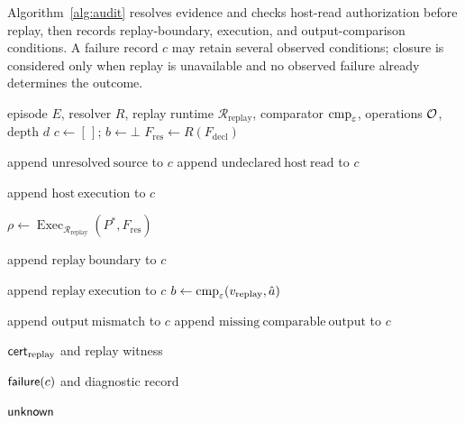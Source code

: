 Algorithm~\ref{alg:audit} resolves evidence and checks host-read authorization
before replay, then records replay-boundary, execution, and output-comparison
conditions. A failure record $c$ may retain several observed conditions;
closure is considered only when replay is unavailable and no observed failure
already determines the outcome.

\begin{algorithm}[!t]
\caption{\ledger episode audit}
\label{alg:audit}
\begin{algorithmic}[1]
\Require episode $E$, resolver $R$, replay runtime
$\mathcal R_{\mathrm{replay}}$, comparator $\operatorname{cmp}_{\varepsilon}$,
operations $\mathcal{O}$, depth $d$
\State $c\gets[\,]$; $b\gets\bot$
\State $F_{\mathrm{res}}\gets R(F_{\mathrm{decl}})$

  \State append $\mathrm{unresolved\ source}$ to $c$
\Else
    \State append $\mathrm{undeclared\ host\ read}$ to $c$
  \EndIf
\EndIf

  \State append $\mathrm{host\ execution}$ to $c$
\EndIf

  \State $\rho\gets
  \operatorname{Exec}_{\mathcal R_{\mathrm{replay}}}
  (P^*,F_{\mathrm{res}})$

    \State append $\mathrm{replay\ boundary}$ to $c$
  \EndIf

    \State append $\mathrm{replay\ execution}$ to $c$
  \Else
    \State $b\gets
    \operatorname{cmp}_{\varepsilon}(v_{\mathrm{replay}},\hat a)$

      \State append $\mathrm{output\ mismatch}$ to $c$
      \State append $\mathrm{missing\ comparable\ output}$ to $c$
    \EndIf
  \EndIf

    \State \Return $\mathsf{cert}_{\mathrm{replay}}$ and replay witness
  \EndIf
\EndIf

  \State \Return $\mathsf{failure}(c)$ and diagnostic record
\EndIf

  \State \Return
\EndIf

\State \Return $\mathsf{unknown}$
\end{algorithmic}
\end{algorithm}

